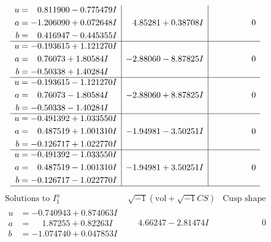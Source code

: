 \documentclass[1p]{elsarticle_modified}
\theoremstyle{definition}
\newcommand{\I}{\sqrt{-1}}
\begin{document}
$$\begin{array}{c|c|c}
\begin{aligned}
u &= \phantom{-}0.811900 - 0.775479 I \\
a &= -1.206090 + 0.072648 I \\
b &= \phantom{-}0.416947 - 0.445355 I\end{aligned}
 & \phantom{-}4.85281 + 0.38708 I & \phantom{-0.000000 } 0 \\ \hline\begin{aligned}
u &= -0.193615 + 1.121270 I \\
a &= \phantom{-}0.76073 + 1.80584 I \\
b &= -0.50338 + 1.40284 I\end{aligned}
 & -2.88060 - 8.87825 I & \phantom{-0.000000 } 0 \\ \hline\begin{aligned}
u &= -0.193615 - 1.121270 I \\
a &= \phantom{-}0.76073 - 1.80584 I \\
b &= -0.50338 - 1.40284 I\end{aligned}
 & -2.88060 + 8.87825 I & \phantom{-0.000000 } 0 \\ \hline\begin{aligned}
u &= -0.491392 + 1.033550 I \\
a &= \phantom{-}0.487519 + 1.001310 I \\
b &= -0.126717 + 1.022770 I\end{aligned}
 & -1.94981 - 3.50251 I & \phantom{-0.000000 } 0 \\ \hline\begin{aligned}
u &= -0.491392 - 1.033550 I \\
a &= \phantom{-}0.487519 - 1.001310 I \\
b &= -0.126717 - 1.022770 I\end{aligned}
 & -1.94981 + 3.50251 I & \phantom{-0.000000 } 0\\
 \hline 
 \end{array}$$\newpage$$\begin{array}{c|c|c}  
\text{Solutions to }I^u_{1}& \I (\text{vol} + \sqrt{-1}CS) & \text{Cusp shape}\\
 \hline 
\begin{aligned}
u &= -0.740943 + 0.874063 I \\
a &= \phantom{-}1.87255 + 0.82263 I \\
b &= -1.074740 + 0.047853 I\end{aligned}
 & \phantom{-}4.66247 - 2.81474 I & \phantom{-0.000000 } 0 \\ \hline\begin{aligned}

\end{aligned}
\end{array}$$
\end{document}

